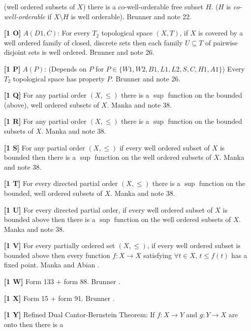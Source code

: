 (well ordered subsets of $X$) there is a co-well-orderable free subset
$H$. ($H$ is {\it co-well-orderable} if $X\setminus H$ is well orderable).
\ac{Brunner} \cite{1989} and note 22.
\smallskip
\item{}{\bf [1 O]} $A(D1,C)$: For every $T_2$ topological space $(X,T)$,
if $X$ is covered by a well ordered family of closed, discrete sets then
each family $U\subseteq T$ of pairwise disjoint sets is  well ordered.
\ac{Brunner} \cite{1983d} and note 26.
\smallskip
\item{}{\bf [1 P]}  $A(P)$: (Depends on $P$ for $P\in
\{W1,W2,B1,L1,L2,S,C,H1,A1\}$) Every $T_2$ topological space has property
$P$.  \ac{Brunner} \cite{1983d} and note 26.
\smallskip
\item{}{\bf [1 Q]}  For any partial order $(X,\le)$ there is a $\sup$
function  on the bounded (above), well ordered subsets of $X$.
\ac{Manka} \cite{1988a} and note 38.
\smallskip
\item{}{\bf [1 R]}  For any partial order $(X,\le)$ there is a $\sup$
function  on the bounded subsets of $X$.
\ac{Manka} \cite{1988a} and note 38.
\smallskip
\item{}{\bf [1 S]}  For any partial order $(X,\le)$ if every
well ordered subset of $X$ is bounded then there is a $\sup$
function on the well ordered subsets of $X$.
\ac{Manka} \cite{1988a} and note 38.
\smallskip
\item{}{\bf [1 T]}  For every directed partial order $(X,\le)$ there is a
$\sup$ function on the bounded, well ordered subsets of $X$.
\ac{Manka} \cite{1988a} and note 38.
\smallskip
\item{}{\bf [1 U]}  For every directed partial order, if every well ordered
subset of $X$ is bounded above then there is a $\sup$ function on
the well ordered subsets of $X$.  \ac{Manka} \cite{1988a} and note 38.
\smallskip
\item{}{\bf [1 V]}  For  every  partially  ordered  set $(X,\le )$,  if
every well ordered subset is bounded above then every function $f : X
\rightarrow  X$ satisfying $\forall t\in X$, $t\le f(t)$ has a fixed
point.  \ac{Manka}  \cite{1988a} and \ac{Abian} \cite{1980}.
\smallskip
\item{}{\bf [1 W]} Form 133 + form 88. \ac{Brunner} \cite{1982a}.
\smallskip
\item{}{\bf [1 X]} Form 15 + form 91.  \ac{Brunner} \cite{1982a}.
\smallskip
\item{}{\bf [1 Y]}  Refined Dual Cantor-Bernstein Theorem:  If $f : X
\rightarrow Y$ and $g : Y \rightarrow  X$ are onto then there is a
